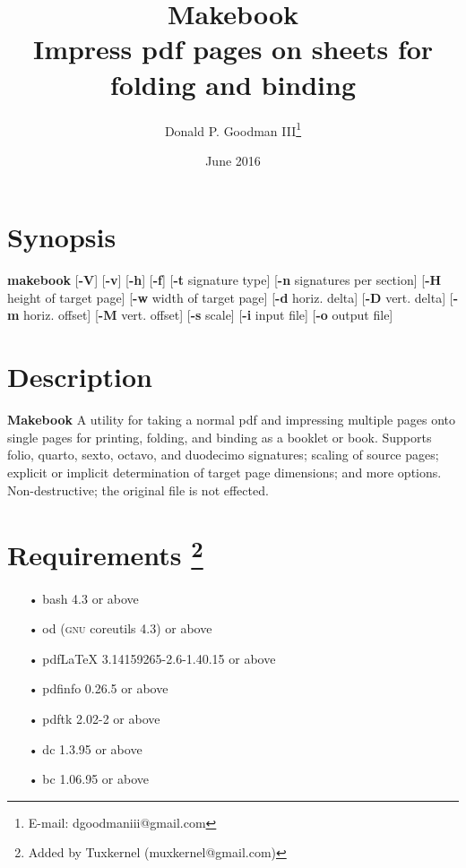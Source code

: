 \documentclass[12pt,twoside,final]{extarticle}
\author{Donald P. Goodman III\footnote{E-mail: dgoodmaniii@gmail.com}}
\title{Makebook \\ Impress pdf pages on sheets for folding and binding}
\date{June 2016}
\let\oldfootnote\footnote
\renewcommand\footnote[1]{%
\oldfootnote{\hspace{1mm}#1}}
\begin{document}
\maketitle
\parindent=5mm
\parskip=0mm
\pagestyle{fancy}
\fancyhf{}
\fancyfoot[CO,CE]{\thepage}
\renewcommand{\headrulewidth}{0pt}
\section{Synopsis}
\textbf{makebook} [\textbf{-V}] [\textbf{-v}] [\textbf{-h}] [\textbf{-f}] [\textbf{-t} signature type] [\textbf{-n} signatures per section] [\textbf{-H} height of target page] [\textbf{-w} width of target page] [\textbf{-d} horiz. delta] [\textbf{-D} vert. delta] [\textbf{-m} horiz. offset] [\textbf{-M} vert. offset] [\textbf{-s} scale] [\textbf{-i} input file] [\textbf{-o} output file]
\section{Description}
\textbf{Makebook} A utility for taking a normal pdf and impressing multiple pages onto single pages for printing, folding, and binding as a booklet or book. Supports folio, quarto, sexto, octavo, and duodecimo signatures; scaling of source pages; explicit or implicit determination of target page dimensions; and more options. Non-destructive; the original file is not effected.
\section{Requirements\protect\footnote{Added by Tuxkernel (muxkernel@gmail.com)}}
\begin{itemize}[noitemsep]
\item[•]bash 4.3 or above
\item[•]od (\textsc{gnu} coreutils 4.3) or above
\item[•]pdfLaTeX 3.14159265-2.6-1.40.15 or above
\item[•]pdfinfo 0.26.5 or above
\item[•]pdftk 2.02-2 or above
\item[•]dc 1.3.95 or above
\item[•]bc 1.06.95 or above
\end{itemize}
\end{document}
